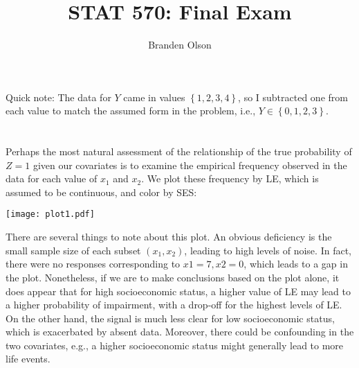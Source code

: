 \documentclass[11pt]{article}
\newcommand*\set[1]{\left\{#1\right\}}
\renewcommand\;{\,}
\begin{document}
\title{STAT 570: Final Exam}
\author{Branden Olson}
\date{}
\maketitle
Quick note: The data for $Y$ came in values $\set{1, 2, 3, 4}$, so I subtracted one from each value to match the assumed form in the problem, i.e., $Y \in \set{0, 1, 2, 3}$. 
\section{}
Perhaps the most natural assessment of the relationship of the true probability of $Z = 1$ given our covariates is to examine the empirical frequency observed in the data for each value of $x_1$ and $x_2$. We plot these frequency by LE, which is assumed to be continuous, and color by SES:
\begin{center}
\texttt{[image: plot1.pdf]}
\end{center}
There are several things to note about this plot. An obvious deficiency is the small sample size of each subset 
$(x_1, x_2)$, leading to high levels of noise. In fact, there were no responses corresponding to $x1 = 7, x2 = 0$, which leads to a gap in the plot. Nonetheless, if we are to make conclusions based on the plot alone, it does appear that for high socioeconomic status, a higher value of LE may lead to a higher probability of impairment, with a drop-off for the highest levels of LE. On the other hand, the signal is much less clear for low socioeconomic status, which is exacerbated by absent data. Moreover, there could be confounding in the two covariates, e.g., a higher socioeconomic status might generally lead to more life events.
\end{document}
